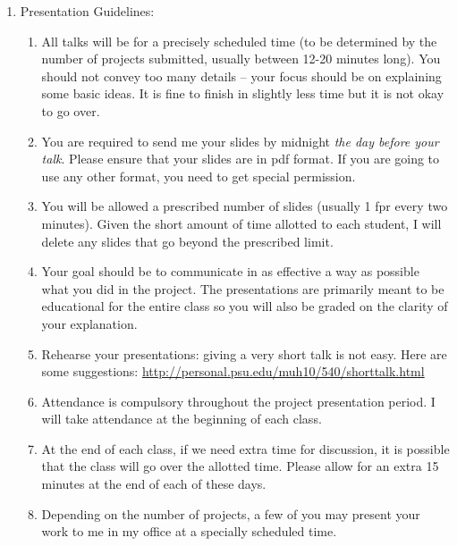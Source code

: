 \documentclass[10pts]{article}
\begin{document}
\begin{itemize}
\begin{enumerate}
\begin{enumerate}
  \end{enumerate}
\item Presentation Guidelines: 
\begin{enumerate}
\item All talks will be for a precisely scheduled time (to be
  determined by the number of projects submitted, usually between 12-20
  minutes long). You should not convey too many details -- your focus
  should be on explaining some basic ideas. It is fine to finish in
  slightly less time but it is not okay to go
  over. %
\item You are required to send me your slides by midnight {\it the day before your talk}. Please ensure that your slides are in pdf format. If you are going to use any other format, you need to get special permission.
\item You will be allowed a prescribed number of slides (usually 1 fpr every two minutes).  Given the short amount of time allotted to each
  student, I will delete any slides that go beyond the prescribed limit.
\item Your goal should be to communicate in as effective a way as possible what you did in the project. The presentations are primarily meant to be educational for the entire class so you will also
 be graded on the clarity of your explanation.
\item Rehearse your presentations: giving a very short talk is not
  easy. Here are some suggestions: \url{http://personal.psu.edu/muh10/540/shorttalk.html}
\item Attendance is compulsory throughout the project presentation period. I will take attendance at the beginning of each class.
\item At the end of each class, if we need extra time for discussion, it is possible that the class will go over the allotted time. Please allow for an extra 15 minutes at the end of each
 of these days. 
\item Depending on the number of projects, a few of you may present your work to me in my office at a specially scheduled time.
\end{enumerate}
\end{enumerate}
\end{itemize}
\end{document}
